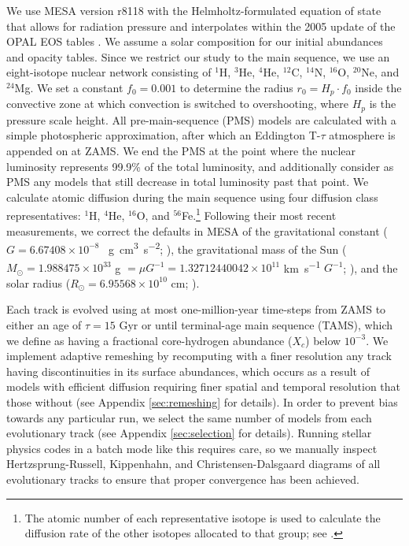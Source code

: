 \documentclass[manuscript]{aastex}
\begin{document}
We use MESA version r8118 with the Helmholtz-formulated equation of state that allows for radiation pressure and interpolates within the 2005 update of the OPAL EOS tables \citep{2002ApJ...576.1064R}. We assume a \citet{1998SSRv...85..161G} solar composition for our initial abundances and opacity tables. Since we restrict our study to the main sequence, we use an eight-isotope nuclear network consisting of $^1$H, $^3$He, $^4$He, $^{12}$C, $^{14}$N, $^{16}$O, $^{20}$Ne, and $^{24}$Mg. We set a constant $f_0 = 0.001$ to determine the radius $r_0 = H_p \cdot f_0$ inside the convective zone at which convection is switched to overshooting, where $H_p$ is the pressure scale height. All pre-main-sequence (PMS) models are calculated with a simple photospheric approximation, after which an Eddington T-$\tau$ atmosphere is appended on at ZAMS. We end the PMS at the point where the nuclear luminosity represents 99.9\% of the total luminosity, and additionally consider as PMS any models that still decrease in total luminosity past that point. %
We calculate atomic diffusion during the main sequence using four diffusion class representatives: $^1$H, $^4$He, $^{16}$O, and $^{56}$Fe.\footnote{The atomic number of each representative isotope is used to calculate the diffusion rate of the other isotopes allocated to that group; see \citealt{Paxton2011}.} 
Following their most recent measurements, we correct the defaults in MESA of the gravitational constant ($G=6.67408\times 10^{-8}$ \si{\per\g\cm\cubed\per\square\s}; \citealt{2015arXiv150707956M}), the gravitational mass of the Sun ($M_\odot = 1.988475\times 10^{33}$ \si{\g} $= \mu G^{-1} = 1.32712440042\times 10^{11}$ \si{\km\per\s} $G^{-1}$; \citealt{pitjeva2015determination}), and the solar radius ($R_\odot = 6.95568\times 10^{10}$ \si{\cm}; \citealt{2008ApJ...675L..53H}). 

Each track is evolved using at most one-million-year time-steps from ZAMS to either an age of $\tau=15$ Gyr or until terminal-age main sequence (TAMS), which we define as having a fractional core-hydrogen abundance ($X_c$) below $10^{-3}$. We implement adaptive remeshing by recomputing with a finer resolution any track having discontinuities in its surface abundances, which occurs as a result of models with efficient diffusion requiring finer spatial and temporal resolution that those without (see Appendix \ref{sec:remeshing} for details). In order to prevent bias towards any particular run, we select the same number of models from each evolutionary track (see Appendix \ref{sec:selection} for details). Running stellar physics codes in a batch mode like this requires care, so we manually inspect Hertzsprung-Russell, Kippenhahn, and Christensen-Dalsgaard diagrams of all evolutionary tracks to ensure that proper convergence has been achieved. %
\end{document}
